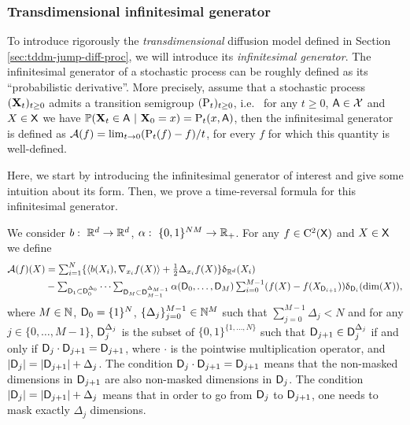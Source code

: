 \subsubsection{Transdimensional infinitesimal generator}

To introduce rigorously the \emph{transdimensional} diffusion model defined in
Section \ref{sec:tddm-jump-diff-proc}, we will introduce its \emph{infinitesimal
  generator}. The infinitesimal generator of a stochastic process can be roughly
defined as its ``probabilistic derivative''. More precisely, assume that a
stochastic process $(\mathbf{X}_t)_{t \geq 0}$ admits a transition semigroup
$(\mathrm{P}_t)_{t \geq 0}$, i.e.~ for any $t \geq 0$, $\mathsf{A} \in \mathcal{X}$ and
$X \in \mathsf{X}$ we have
$\mathbb{P}(\mathbf{X}_t \in \mathsf{A} \ | \ \mathbf{X}_0 = x) = \mathrm{P}_t(x, \mathsf{A})$, then the
infinitesimal generator is defined as
${\mathcal{A}}(f) = \lim_{t \to 0} (\mathrm{P}_t(f) - f)/t$, for every $f$ for which this
quantity is well-defined.

Here, we start by introducing the infinitesimal generator of interest and give
some intuition about its form. Then, we prove a time-reversal formula for this
infinitesimal generator. 

We consider $b: \ \mathbb{R}^d \to \mathbb{R}^d$, $\alpha: \ \{0,1\}^{NM} \to \mathbb{R}_+$. 
For any $f \in \mathrm{C}^2(\mathsf{X})$ and $X \in \mathsf{X}$ we define
\begin{align}
  \label{eq:definition_generator}
  {\mathcal{A}}(f)(X) &\textstyle= \sum_{i=1}^N \{ \langle b(X_i), \nabla_{x_i}f(X) \rangle + \tfrac{1}{2} \Delta_{x_i}f(X)\} \updelta_{\mathbb{R}^d}(X_i) \\
  & -\textstyle \sum_{\mathsf{D}_1 \subset \mathsf{D}_0^{\Delta_0}} \dots  \sum_{\mathsf{D}_M \subset \mathsf{D}_{M-1}^{\Delta_{M-1}}} \alpha(\mathsf{D}_0, \dots, \mathsf{D}_M) \sum_{i=0}^{M-1} (f(X) - f(X_{\mathsf{D}_{i+1}})) \updelta_{\mathsf{D}_i}(\mathrm{dim}(X)) ,
\end{align}
where $M \in \mathbb{N}$, $\mathsf{D}_0 = \{1\}^N$,
$\{\Delta_j\}_{j=0}^{M-1} \in \mathbb{N}^{M}$ such that
$\sum_{j=0}^{M-1} \Delta_j < N$ and for any $j \in \{0, \dots, M-1\}$,
$\mathsf{D}_j^{\Delta_j}$ is the subset of $\{0,1\}^{\{1, \dots, N\}}$ such that
$\mathsf{D}_{j+1} \in \mathsf{D}_j^{\Delta_j}$ if and only if
$\mathsf{D}_j \cdot \mathsf{D}_{j+1} = \mathsf{D}_{j+1}$, where $\cdot$ is the pointwise
multiplication operator, and $|\mathsf{D}_j| = |\mathsf{D}_{j+1}| + \Delta_j$. The condition
$\mathsf{D}_j \cdot \mathsf{D}_{j+1} = \mathsf{D}_{j+1}$ means that the non-masked dimensions in
$\mathsf{D}_{j+1}$ are also non-masked dimensions in $\mathsf{D}_j$. The condition
$|\mathsf{D}_j| = |\mathsf{D}_{j+1}| + \Delta_j$ means that in order to go from $\mathsf{D}_j$ to
$\mathsf{D}_{j+1}$, one needs to mask exactly $\Delta_j$ dimensions.

